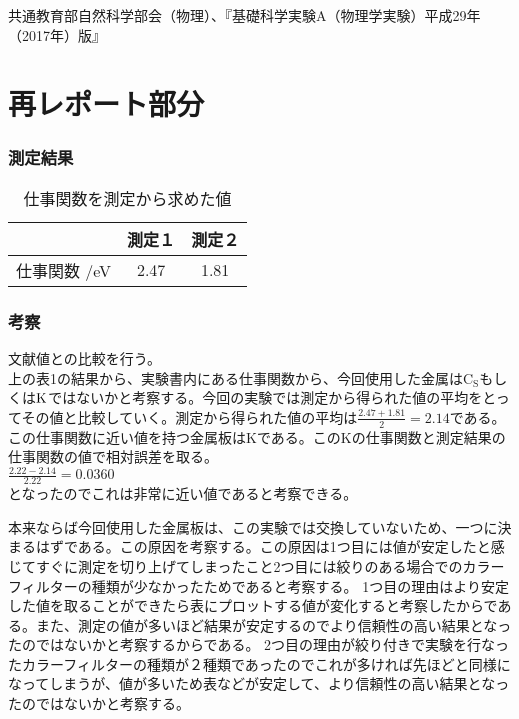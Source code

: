 \documentclass{jsarticle}
\begin{document}
\begin{thebibliography}{99}
     共通教育部自然科学部会（物理）、『基礎科学実験A（物理学実験）平成29年（2017年）版』
\end{thebibliography}

\newpage
\section{再レポート部分}

\subsubsection{測定結果}

\begin{table}[H]
    \centering
    \caption{仕事関数を測定から求めた値}
    \label{my-label}
    \begin{tabular}{|c|c|c|}
    \hline
         & 測定１  & 測定２  \\ \hline
    仕事関数 /eV & 2.47 & 1.81 \\ \hline
    \end{tabular}
    \end{table}

\subsubsection{考察}

文献値との比較を行う。\\
上の表1の結果から、実験書内にある仕事関数から、今回使用した金属は$\textrm{C}_\textrm{S}$もしくは$\textrm K$ではないかと考察する。今回の実験では測定から得られた値の平均をとってその値と比較していく。測定から得られた値の平均は$\frac{2.47+1.81}{2} = 2.14$である。この仕事関数に近い値を持つ金属板はKである。このKの仕事関数と測定結果の仕事関数の値で相対誤差を取る。\\
$\frac{2.22 - 2.14}{2.22}= 0.0360$\\
となったのでこれは非常に近い値であると考察できる。

本来ならば今回使用した金属板は、この実験では交換していないため、一つに決まるはずである。この原因を考察する。この原因は1つ目には値が安定したと感じてすぐに測定を切り上げてしまったこと2つ目には絞りのある場合でのカラーフィルターの種類が少なかったためであると考察する。
1つ目の理由はより安定した値を取ることができたら表にプロットする値が変化すると考察したからである。また、測定の値が多いほど結果が安定するのでより信頼性の高い結果となったのではないかと考察するからである。
2つ目の理由が絞り付きで実験を行なったカラーフィルターの種類が２種類であったのでこれが多ければ先ほどと同様になってしまうが、値が多いため表などが安定して、より信頼性の高い結果となったのではないかと考察する。
\end{document}
